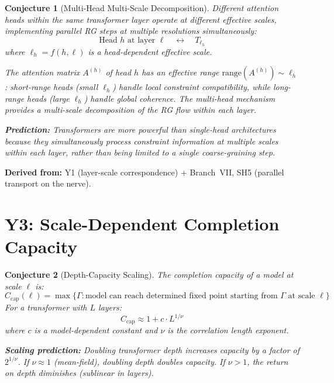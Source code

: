 \documentclass[11pt,letterpaper]{article}
\newtheorem{conjecture}{Conjecture}[section]
\begin{document}
\begin{conjecture}[Multi-Head Multi-Scale 
Decomposition]\label{conj:multihead}
Different attention heads within the same transformer layer operate 
at different effective scales, implementing parallel RG steps at 
multiple resolutions simultaneously:
\begin{equation}\label{eq:multihead_scale}
    \text{Head } h \text{ at layer } \ell 
    \quad\longleftrightarrow\quad T_{\ell_h}
\end{equation}
where $\ell_h = f(h, \ell)$ is a head-dependent effective scale.

The attention matrix $A^{(h)}$ of head $h$ has an effective range 
$\mathrm{range}(A^{(h)}) \sim \ell_h$: short-range heads (small 
$\ell_h$) handle local constraint compatibility, while long-range 
heads (large $\ell_h$) handle global coherence. The multi-head 
mechanism provides a \emph{multi-scale decomposition} of the RG 
flow within each layer.

\textbf{Prediction:} Transformers are more powerful than 
single-head architectures because they simultaneously process 
constraint information at multiple scales within each layer, rather 
than being limited to a single coarse-graining step.
\end{conjecture}

\textbf{Derived from:} Y1 (layer-scale correspondence) + 
Branch~VII, SH5 (parallel transport on the nerve).

\section{Y3: Scale-Dependent Completion Capacity}

\begin{conjecture}[Depth-Capacity 
Scaling]\label{conj:capacity}
The \emph{completion capacity} of a model at scale $\ell$ is:
\begin{equation}\label{eq:capacity}
    C_{\mathrm{cap}}(\ell) = \max\{\Gamma : \text{model can reach 
    determined fixed point starting from } \Gamma \text{ at scale } 
    \ell\}
\end{equation}
For a transformer with $L$ layers:
\begin{equation}\label{eq:capacity_depth}
    C_{\mathrm{cap}} \approx 1 + c \cdot L^{1/\nu}
\end{equation}
where $c$ is a model-dependent constant and $\nu$ is the 
correlation length exponent.

\textbf{Scaling prediction:} Doubling transformer depth increases 
capacity by a factor of $2^{1/\nu}$. If $\nu \approx 1$ 
(mean-field), doubling depth doubles capacity. If $\nu > 1$, the 
return on depth diminishes (sublinear in layers).
\end{conjecture}
\end{document}
